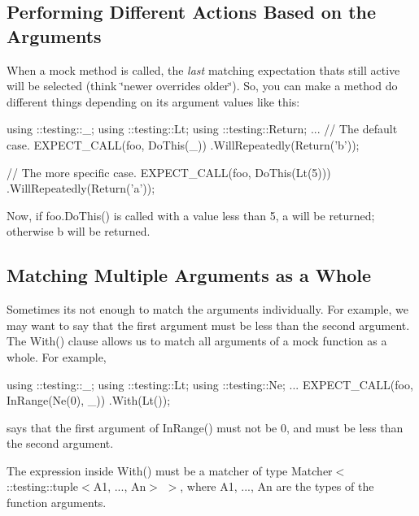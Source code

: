 \subsection*{Performing Different Actions Based on the Arguments}

When a mock method is called, the {\itshape last} matching expectation that\textquotesingle{}s still active will be selected (think \char`\"{}newer overrides older\char`\"{}). So, you can make a method do different things depending on its argument values like this\+:


\begin{DoxyCode}
using ::testing::\_;
using ::testing::Lt;
using ::testing::Return;
...
  \textcolor{comment}{// The default case.}
  EXPECT\_CALL(foo, DoThis(\_))
      .WillRepeatedly(Return(\textcolor{charliteral}{'b'}));

  \textcolor{comment}{// The more specific case.}
  EXPECT\_CALL(foo, DoThis(Lt(5)))
      .WillRepeatedly(Return(\textcolor{charliteral}{'a'}));
\end{DoxyCode}


Now, if {\ttfamily foo.\+Do\+This()} is called with a value less than 5, {\ttfamily \textquotesingle{}a\textquotesingle{}} will be returned; otherwise {\ttfamily \textquotesingle{}b\textquotesingle{}} will be returned.

\subsection*{Matching Multiple Arguments as a Whole}

Sometimes it\textquotesingle{}s not enough to match the arguments individually. For example, we may want to say that the first argument must be less than the second argument. The {\ttfamily With()} clause allows us to match all arguments of a mock function as a whole. For example,


\begin{DoxyCode}
using ::testing::\_;
using ::testing::Lt;
using ::testing::Ne;
...
  EXPECT\_CALL(foo, InRange(Ne(0), \_))
      .With(Lt());
\end{DoxyCode}


says that the first argument of {\ttfamily In\+Range()} must not be 0, and must be less than the second argument.

The expression inside {\ttfamily With()} must be a matcher of type {\ttfamily Matcher$<$ \+::testing\+::tuple$<$A1, ..., An$>$ $>$}, where {\ttfamily A1}, ..., {\ttfamily An} are the types of the function arguments.

